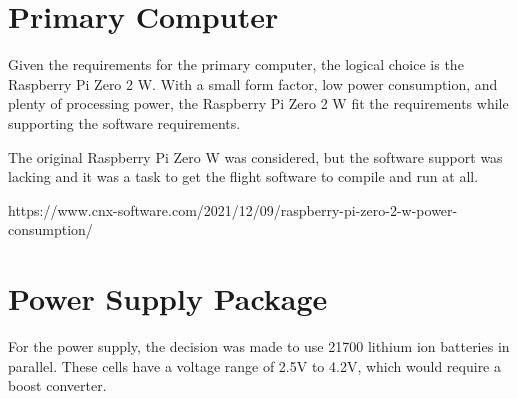 \section{Primary Computer}

Given the requirements for the primary computer, the logical choice is the
Raspberry Pi Zero 2 W. With a small form factor, low power consumption, and
plenty of processing power, the Raspberry Pi Zero 2 W fit the requirements
while supporting the software requirements.

The original Raspberry Pi Zero W was considered, but the software support
was lacking and it was a task to get the flight software to compile and run
at all.

https://www.cnx-software.com/2021/12/09/raspberry-pi-zero-2-w-power-consumption/

\section{Power Supply Package}

For the power supply, the decision was made to use 21700 lithium ion batteries
in parallel. These cells have a voltage range of 2.5V to 4.2V, which would
require a boost converter.